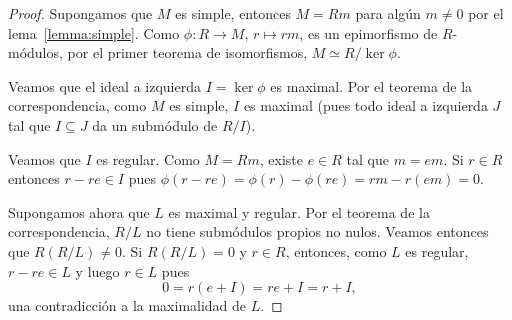 \begin{proof}
	Supongamos que $M$ es simple, entonces $M=Rm$ para algún $m\ne0$ por el
	lema~\ref{lemma:simple}. Como $\phi\colon R\to M$, $r\mapsto rm$, es un
	epimorfismo de $R$-módulos, por el primer teorema de isomorfismos, 
	$M\simeq R/\ker\phi$. 
	
	Veamos que el ideal a izquierda $I=\ker\phi$ es maximal. Por el teorema de
	la correspondencia, como $M$ es simple, $I$ es maximal (pues todo ideal a
	izquierda $J$ tal que $I\subseteq J$ da un submódulo de $R/I$).

	Veamos que $I$ es regular. Como $M=Rm$, existe $e\in R$ tal que $m=em$. Si
	$r\in R$ entonces $r-re\in I$ pues
	$\phi(r-re)=\phi(r)-\phi(re)=rm-r(em)=0$.

	Supongamos ahora que $L$ es maximal y regular.  Por el teorema de la
	correspondencia, $R/L$ no tiene submódulos propios no nulos. Veamos
	entonces que $R(R/L)\ne0$. Si $R(R/L)=0$ y $r\in R$, entonces, como $L$ es
	regular, $r-re\in L$ y luego $r\in L$ pues 
	\[
	0=r(e+I)=re+I=r+I,
	\]
	una contradicción a la maximalidad de $L$.
\end{proof}


